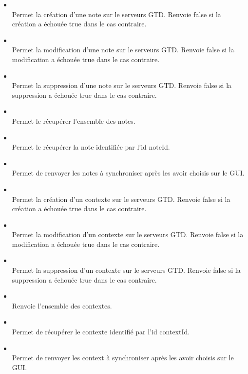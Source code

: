 \begin{itemize}
	\item {} \\
	Permet la création  d'une note sur  le serveurs GTD. Renvoie false si la création a échouée true dans le cas contraire.
	\item {} \\
	Permet la modification d'une note sur le serveurs GTD. Renvoie false si la modification a échouée true dans le cas contraire.
	\item {} \\
	Permet la suppression d'une note sur  le serveurs GTD. Renvoie false si la suppression a échouée true dans le cas contraire.
	\item {} \\
	Permet le récupérer l'ensemble des notes.
	\item {} \\
	Permet le récupérer la note identifiée par l'id noteId.
	\item {} \\
	Permet de renvoyer les notes à synchroniser après les avoir choisis sur le GUI.

	\item {} \\
	Permet la création  d'un contexte sur  le serveurs GTD. Renvoie false si la création a échouée true dans le cas contraire.
	\item {} \\
	Permet la modification  d'un contexte sur  le serveurs GTD. Renvoie false si la modification a échouée true dans le cas contraire.
	\item {} \\
	Permet la suppression  d'un contexte sur  le serveurs GTD. Renvoie false si la suppression a échouée true dans le cas contraire.
	\item {} \\
	Renvoie l'ensemble des contextes.
	\item {} \\
	Permet de récupérer le contexte identifié par l'id contextId.
	\item {} \\
	Permet de renvoyer les context à synchroniser après les avoir choisis sur le GUI.
		

\end{itemize}
